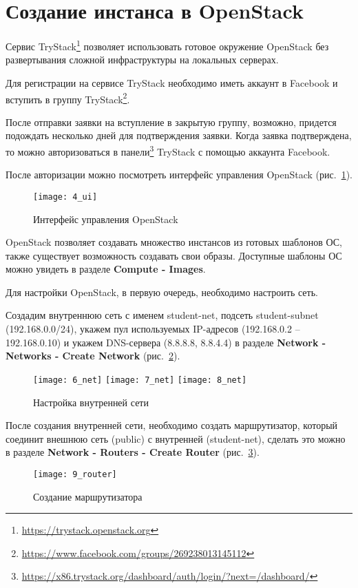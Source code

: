 \section{Создание инстанса в OpenStack} \label{pril:f}

Сервис TryStack\footnote{\url{https://trystack.openstack.org}} позволяет использовать готовое окружение OpenStack без развертывания сложной инфраструктуры на локальных серверах.

Для регистрации на сервисе TryStack необходимо иметь аккаунт в Facebook и вступить в группу TryStack\footnote{\url{https://www.facebook.com/groups/269238013145112}}.

После отправки заявки на вступление в закрытую группу, возможно, придется подождать несколько дней для подтверждения заявки.
Когда заявка подтверждена, то можно авторизоваться в панели\footnote{\url{https://x86.trystack.org/dashboard/auth/login/?next=/dashboard/}} TryStack с помощью аккаунта Facebook.

После авторизации можно посмотреть интерфейс управления OpenStack (рис.~\ref{pic:ui}).
\begin{figure}[ht]
    \centering
    \texttt{[image: 4\_ui]}
    \caption{Интерфейс управления OpenStack}\label{pic:ui}
\end{figure}

OpenStack позволяет создавать множество инстансов из готовых шаблонов ОС, также существует возможность создавать свои образы.
Доступные шаблоны ОС можно увидеть в разделе \textbf{Compute - Images}.

Для настройки OpenStack, в первую очередь, необходимо настроить сеть.

Создадим внутреннюю сеть с именем student-net, подсеть student-subnet (192.168.0.0/24), укажем пул используемых IP-адресов (192.168.0.2 -- 192.168.0.10) и укажем DNS-сервера (8.8.8.8, 8.8.4.4) в разделе \textbf{Network - Networks - Create Network} (рис.~\ref{pic:net}).
\begin{figure}[ht]
    \centering
    \texttt{[image: 6\_net]}
    \texttt{[image: 7\_net]}
    \texttt{[image: 8\_net]}
    \caption{Настройка внутренней сети}\label{pic:net}
\end{figure}

\clearpage

После создания внутренней сети, необходимо создать маршрутизатор, который соединит внешнюю сеть (public) с внутренней (student-net), сделать это можно в разделе \textbf{Network - Routers - Create Router} (рис.~\ref{pic:router}).
\begin{figure}[ht]
    \centering
    \texttt{[image: 9\_router]}
    \caption{Создание маршрутизатора}\label{pic:router}
\end{figure}

